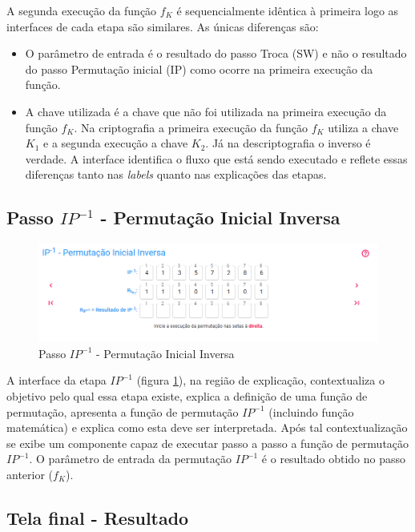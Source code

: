 A segunda execução da função \(f_K\) é sequencialmente idêntica à primeira logo as interfaces de cada etapa são similares. As únicas diferenças são:
\begin{itemize}
    \item O parâmetro de entrada é o resultado do passo Troca (SW) e não o resultado do passo Permutação inicial (IP) como ocorre na primeira execução da função.
    \item A chave utilizada é a chave que não foi utilizada na primeira execução da função \(f_K\). Na criptografia a primeira execução da função \(f_K\) utiliza a chave \(K_1\) e a segunda execução a chave \(K_2\). Já na descriptografia o inverso é verdade. A interface identifica o fluxo que está sendo executado e reflete essas diferenças tanto nas \textit{labels} quanto nas explicações das etapas.
\end{itemize}

\subsection{Passo \(IP^{-1}\) - Permutação Inicial Inversa}

\begin{figure}[H]
    \centering
    \caption{Passo \(IP^{-1}\) - Permutação Inicial Inversa}
    \label{fig:uiiip}
    \includegraphics[width=1\linewidth]{UI/UIIP-1.png}
\end{figure}

A interface da etapa \(IP^{-1}\) (figura \ref{fig:uiiip}), na região de explicação, contextualiza o objetivo pelo qual essa etapa existe, explica a definição de uma função de permutação, apresenta a função de permutação \(IP^{-1}\) (incluindo função matemática) e explica como esta deve ser interpretada. Após tal contextualização se exibe um componente capaz de executar passo a passo a função de permutação \(IP^{-1}\). O parâmetro de entrada da permutação \(IP^{-1}\) é o resultado obtido no passo anterior (\(f_K\)).

\subsection{Tela final - Resultado}


